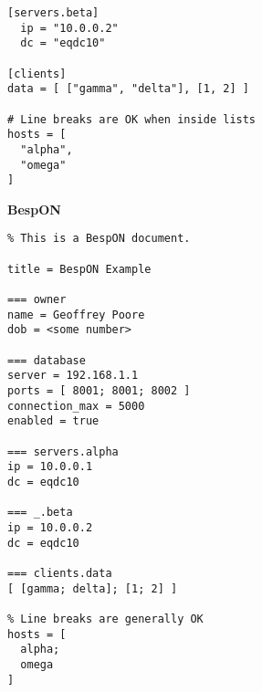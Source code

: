 \documentclass[11pt]{article}
\begin{document}
\begin{appendices}
\begin{tcolorbox}{}
\begin{multicols}{2}
\begin{Verbatim}[formatcom=\color{DarkGreen}]
  [servers.beta]
  ip = "10.0.0.2"
  dc = "eqdc10"

[clients]
data = [ ["gamma", "delta"], [1, 2] ]

# Line breaks are OK when inside lists
hosts = [
  "alpha",
  "omega"
]
\end{Verbatim}
\columnbreak
\centering \textbf{BespON}

\begin{Verbatim}
% This is a BespON document.

title = BespON Example

=== owner
name = Geoffrey Poore
dob = <some number>

=== database
server = 192.168.1.1
ports = [ 8001; 8001; 8002 ]
connection_max = 5000
enabled = true

=== servers.alpha
ip = 10.0.0.1
dc = eqdc10

=== _.beta
ip = 10.0.0.2
dc = eqdc10

=== clients.data
[ [gamma; delta]; [1; 2] ]

% Line breaks are generally OK
hosts = [
  alpha;
  omega
]
\end{Verbatim}
\end{multicols}
\end{tcolorbox}



\end{appendices}
\end{document}
